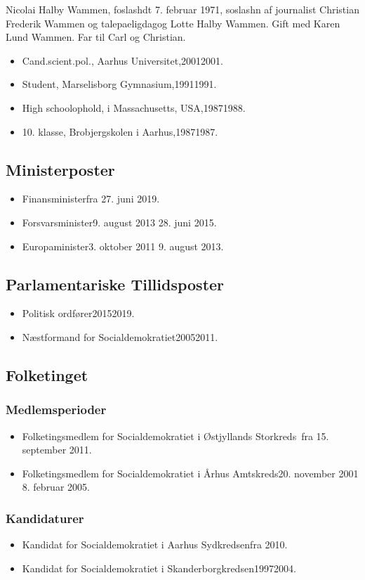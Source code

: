 \documentclass[11pt, a4paper]{awesome-cv}
\begin{document}
\makecvheader[R]
\makelettertitle
\begin{cvletter}
Nicolai Halby Wammen, foslashdt 7. februar 1971, soslashn af journalist Christian Frederik Wammen og talepaeligdagog Lotte Halby Wammen. Gift med Karen Lund Wammen. Far til Carl og Christian.

\begin{itemize}
\item Cand.scient.pol., Aarhus Universitet,20012001.
\item Student, Marselisborg Gymnasium,19911991.
\item High schoolophold, i Massachusetts, USA,19871988.
\item 10. klasse, Brobjergskolen i Aarhus,19871987.
\end{itemize}
\subsection*{Ministerposter}
\begin{itemize}
\item Finansministerfra 27. juni 2019.
\item Forsvarsminister9. august 2013  28. juni 2015.
\item Europaminister3. oktober 2011  9. august 2013.
\end{itemize}
\subsection*{Parlamentariske Tillidsposter}
\begin{itemize}
\item Politisk ordfører20152019.
\item Næstformand for Socialdemokratiet20052011.
\end{itemize}
\subsection*{Folketinget}
\subsubsection*{Medlemsperioder}
\begin{itemize}
\item Folketingsmedlem for Socialdemokratiet i Østjyllands Storkreds fra 15. september 2011.
\item Folketingsmedlem for Socialdemokratiet i Århus Amtskreds20. november 2001  8. februar 2005.
\end{itemize}
\subsubsection*{Kandidaturer}
\begin{itemize}
\item Kandidat for Socialdemokratiet i Aarhus Sydkredsenfra 2010.
\item Kandidat for Socialdemokratiet i Skanderborgkredsen19972004.
\end{itemize}
\end{cvletter}
\end{document}

